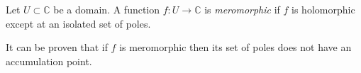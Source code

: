 \documentclass[12pt]{article}
\begin{document}
Let $U \subset \mathbb{C}$ be a domain. A function $f\colon U \to \mathbb{C}$ is \emph{meromorphic} if $f$ is holomorphic except at an isolated set of poles.

It can be proven that if $f$ is meromorphic then its set of poles does not have an accumulation point.
\end{document}
